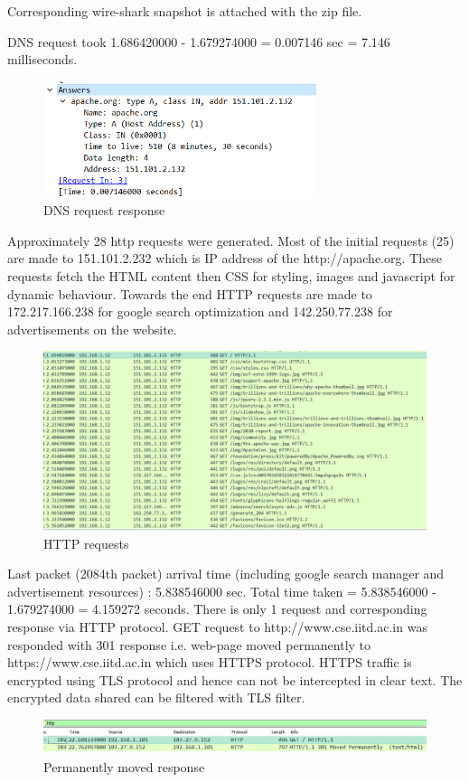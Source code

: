 \documentclass[]{assignment}
\begin{document}
Corresponding wire-shark snapshot is attached with the zip file. 
\begin{alphaparts}
    \questionpart DNS request took 1.686420000 - 1.679274000 = 0.007146 sec = 7.146 milliseconds.
    \begin{figure}[hbt!]
    \centering
    \includegraphics[width=8cm]{assignment-1/report/dnstime.png}
    \caption{DNS request response}
    \label{fig:galaxy}
    \end{figure}
    \questionpart Approximately 28 http requests were generated. Most of the initial requests (25) are made to 151.101.2.232 which is IP address of the http://apache.org. These requests fetch the HTML content then CSS for styling, images and javascript for dynamic behaviour. Towards the end HTTP requests are made to 172.217.166.238 for google search optimization and 142.250.77.238 for advertisements on the website.
    \begin{figure}[hbt!]
    \centering
    \includegraphics[width=15cm]{assignment-1/report/getrequests.png}
    \caption{HTTP requests}
    \label{fig:galaxy}
    \end{figure}
    \questionpart Last packet (2084th packet) arrival time (including google search manager and advertisement resources) : 5.838546000 sec. Total time taken = 5.838546000 - 1.679274000 = 4.159272 seconds.
    \questionpart There is only 1 request and corresponding response via HTTP protocol. GET request to http://www.cse.iitd.ac.in was responded with 301 response i.e. web-page moved permanently to https://www.cse.iitd.ac.in which uses HTTPS protocol. HTTPS traffic is encrypted using TLS protocol and hence can not be intercepted in clear text. The encrypted data shared can be filtered with TLS filter.
            \begin{figure}[hbt!]
    \centering
    \includegraphics[width=14cm]{assignment-1/report/moved.png}
    \caption{Permanently moved response}
    \label{fig:galaxy}
    \end{figure}

 \end{alphaparts}
   \pagebreak
    
\end{document}

